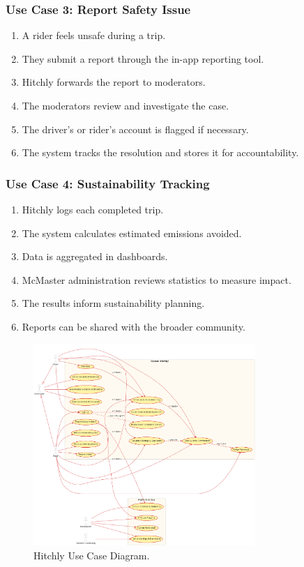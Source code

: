 \documentclass[12pt,letterpaper]{article}
\begin{document}
\subsubsection*{Use Case 3: Report Safety Issue}
\begin{enumerate}
    \item A rider feels unsafe during a trip.
    \item They submit a report through the in-app reporting tool.
    \item Hitchly forwards the report to moderators.
    \item The moderators review and investigate the case.
    \item The driver’s or rider’s account is flagged if necessary.
    \item The system tracks the resolution and stores it for accountability.
\end{enumerate}

\subsubsection*{Use Case 4: Sustainability Tracking}
\begin{enumerate}
    \item Hitchly logs each completed trip.
    \item The system calculates estimated emissions avoided.
    \item Data is aggregated in dashboards.
    \item McMaster administration reviews statistics to measure impact.
    \item The results inform sustainability planning.
    \item Reports can be shared with the broader community.
\end{enumerate}

\begin{figure}[htbp]
  \centering
  \includegraphics[width=0.75\textwidth]{use-case.png}
  \caption{Hitchly Use Case Diagram.}
  \label{fig:ride-matching}
\end{figure}
\end{document}
